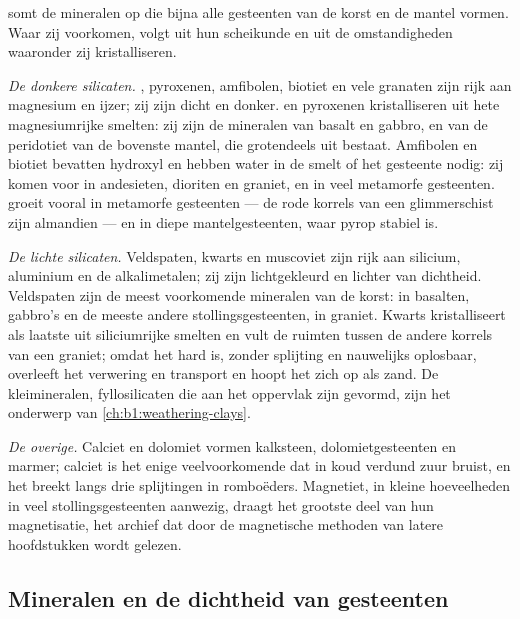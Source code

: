  somt de mineralen op die bijna alle gesteenten van de korst en de mantel vormen. Waar zij
voorkomen, volgt uit hun scheikunde en uit de omstandigheden waaronder zij kristalliseren.

\emph{De donkere silicaten.} , pyroxenen, amfibolen, biotiet en vele granaten zijn rijk aan magnesium en ijzer; zij zijn
dicht en donker.  en pyroxenen kristalliseren uit hete magnesiumrijke smelten: zij zijn de mineralen van basalt en gabbro,
en van de peridotiet van de bovenste mantel, die grotendeels uit  bestaat. Amfibolen en biotiet bevatten hydroxyl en hebben
water in de smelt of het gesteente nodig: zij komen voor in andesieten, dioriten en graniet, en in veel metamorfe gesteenten.
 groeit vooral in metamorfe gesteenten --- de rode korrels van een glimmerschist zijn almandien --- en in diepe mantelgesteenten,
waar pyrop stabiel is.

\emph{De lichte silicaten.} Veldspaten, kwarts en muscoviet zijn rijk aan silicium, aluminium en de alkalimetalen; zij zijn lichtgekleurd
en lichter van dichtheid. Veldspaten zijn de meest voorkomende mineralen van de korst:  in basalten, gabbro's en de meeste
andere stollingsgesteenten,  in graniet. Kwarts kristalliseert als laatste uit siliciumrijke smelten en vult de ruimten
tussen de andere korrels van een graniet; omdat het hard is, zonder splijting en nauwelijks oplosbaar, overleeft het verwering en
transport en hoopt het zich op als zand. De kleimineralen, fyllosilicaten die aan het oppervlak zijn gevormd, zijn het onderwerp van
\cref{ch:b1:weathering-clays}.

\emph{De overige.} Calciet en dolomiet vormen kalksteen, dolomietgesteenten en marmer; calciet is het enige veelvoorkomende  dat
in koud verdund zuur bruist, en het breekt langs drie splijtingen in romboëders. Magnetiet, in kleine hoeveelheden in veel stollingsgesteenten
aanwezig, draagt het grootste deel van hun magnetisatie, het archief dat door de magnetische methoden van latere hoofdstukken wordt gelezen.


\subsection{Mineralen en de dichtheid van gesteenten}

